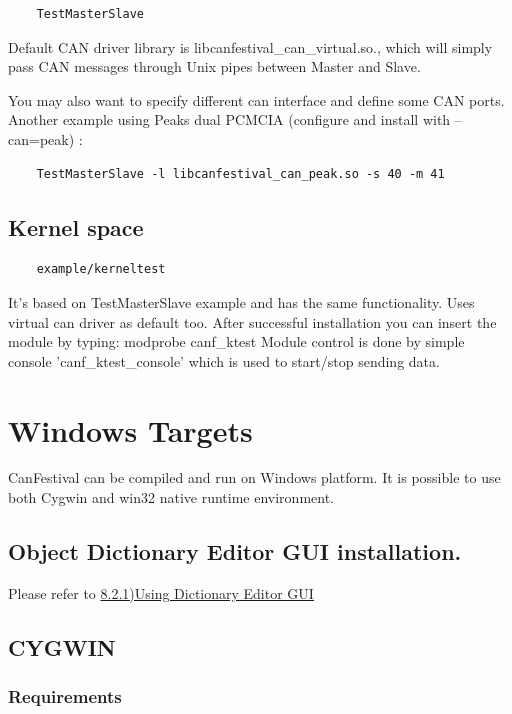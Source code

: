 \documentclass[12pt,english,a4paper]{book}
\begin{document}
\begin{verbatim}
	TestMasterSlave
\end{verbatim}


Default CAN driver library is libcanfestival\_can\_virtual.so., which
will simply pass CAN messages through Unix pipes between Master and
Slave.

You may also want to specify different can interface and define some
CAN ports. Another example using Peak{\textquotesingle}s dual PCMCIA
(configure and install with --can=peak) :


\begin{verbatim}
	TestMasterSlave -l libcanfestival_can_peak.so -s 40 -m 41
\end{verbatim}


\subsection{Kernel space}


\begin{verbatim}
	example/kerneltest
\end{verbatim}


It's based on TestMasterSlave example
and has the same functionality. Uses virtual can driver as default
too. After successful installation you can insert the module by typing:
modprobe canf\_ktest Module control is done by simple console 'canf\_ktest\_console'
which is used to start/stop sending data.


\section{Windows Targets}

CanFestival can be compiled and run on Windows platform. It is possible
to use both Cygwin and win32 native runtime environment.

\subsection{Object Dictionary Editor GUI installation.}

Please refer to \hyperlink{a821UsingDictionaryEditorGUIoutline}{8.2.1)Using
Dictionary Editor GUI}

\subsection{CYGWIN}

\subsubsection{Requirements}
\end{document}
